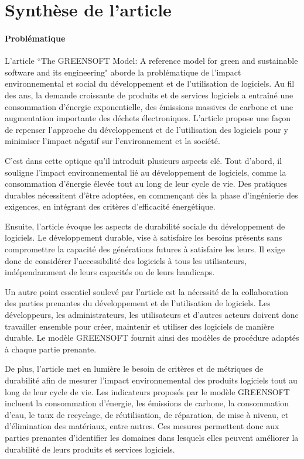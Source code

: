 \section{Synthèse de l'article}

\paragraph{Problématique}
L’article “The GREENSOFT Model: A reference model for green and sustainable software and its engineering" aborde la problématique de l'impact environnemental et social du développement et de l'utilisation de logiciels. Au fil des ans, la demande croissante de produits et de services logiciels a entraîné une consommation d'énergie exponentielle, des émissions massives de carbone et une augmentation importante des déchets électroniques. L'article propose une façon de repenser l'approche du développement et de l'utilisation des logiciels pour y minimiser l'impact négatif sur l'environnement et la société.

C'est dans cette optique qu'il introduit plusieurs aspects clé. Tout d'abord, il souligne l'impact environnemental lié au développement de logiciels, comme la consommation d'énergie élevée tout au long de leur cycle de vie. Des pratiques durables nécessitent d'être adoptées, en commençant dès la phase d'ingénierie des exigences, en intégrant des critères d'efficacité énergétique.

Ensuite, l'article évoque les aspects de durabilité sociale du développement de logiciels. Le développement durable, vise à satisfaire les besoins présents sans compromettre la capacité des générations futures à satisfaire les leurs. Il exige donc de considérer l'accessibilité des logiciels à tous les utilisateurs, indépendamment de leurs capacités ou de leurs handicaps.

Un autre point essentiel soulevé par l'article est la nécessité de la collaboration des parties prenantes du développement et de l'utilisation de logiciels. Les développeurs, les administrateurs, les utilisateurs et d'autres acteurs doivent donc travailler ensemble pour créer, maintenir et utiliser des logiciels de manière durable. Le modèle GREENSOFT fournit ainsi des modèles de procédure adaptés à chaque partie prenante.

De plus, l'article met en lumière le besoin de critères et de métriques de durabilité afin de mesurer l'impact environnemental des produits logiciels tout au long de leur cycle de vie. Les indicateurs proposés par le modèle GREENSOFT incluent la consommation d'énergie, les émissions de carbone, la consommation d'eau, le taux de recyclage, de réutilisation, de réparation, de mise à niveau, et d'élimination des matériaux, entre autres. Ces mesures permettent donc aux parties prenantes d'identifier les domaines dans lesquels elles peuvent améliorer la durabilité de leurs produits et services logiciels.


